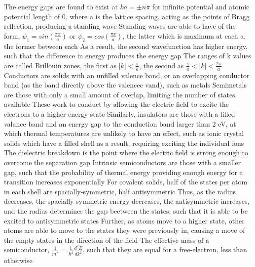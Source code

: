 \documentclass[11 pt, twoside]{article}
\newenvironment{outline*}
{
	\begin{outline}[enumerate]
	}
	{\end{outline}
}
\begin{document}
\begin{outline*}
			\4 The energy gaps are found to exist at $ka = \pm n\pi$ for infinite potential and atomic potential length of 0, where a is the lattice spacing, acting as the points of Bragg reflection, producing a standing wave
			\4 Standing waves are able to have of the form, $\psi_1 = sin(\frac{\pi x}{a})$ or $\psi_2 = cos(\frac{\pi x}{a})$, the latter which is maximum at each a, the former between each
			\4 As a result, the second wavefunction has higher energy, such that the difference in energy produces the energy gap
			\4 The ranges of k values are called Brillouin zones, the first as $|k| < \frac{\pi}{a}$, the second as $\frac{\pi}{a} < |k| < \frac{2\pi}{a}$
	\2 Conductors are solids with an unfilled valence band, or an overlapping conductor band (as the band directly above the valencec vand), such as metals
		\3 Semimetals are those with only a small amount of overlap, limiting the number of states available
		\3 These work to conduct by allowing the electric field to excite the electrons to a higher energy state
	\2 Similarly, insulators are those with a filled valance band and an energy gap to the conduction band larger than 2 eV, at which thermal temperatures are unlikely to have an effect, such as ionic crystal solids which have a filled shell as a result, requiring exciting the individual ions
		\3 The dielectric breakdown is the point where the electric field is strong enough to overcome the separation gap
	\2 Intrinsic semiconductors are those with a smaller gap, such that the probability of thermal energy providing enough energy for a transition increases exponentially
		\3 For covalent solids, half of the states per atom in each shell are spacially-symmetric, half antisymmetric
		\3 Thus, as the radius decreases, the spacially-symmetric energy decreases, the antisymmetric increases, and the radius determines the gap beetween the states, such that it is able to be excited to antisymmetric states
	\2 Further, as atoms move to a higher state, other atoms are able to move to the states they were previously in, causing a move of the empty states in the direction of the field
	\2 The effective mass of a semiconductor, $\frac{1}{m^*} = \frac{1}{\hbar^2}\frac{d^2E}{dk^2}$, such that they are equal for a free-electron, less than otherwise
\end{outline*}
\end{document}
